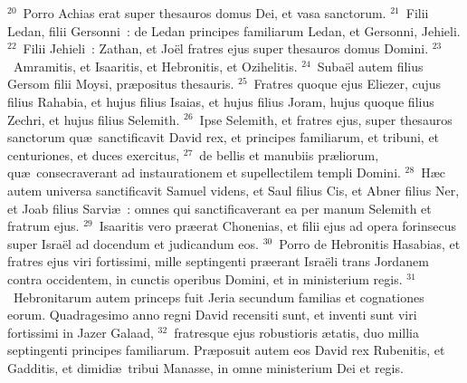 ${}^{20}$~Porro Achias erat super thesauros domus Dei, et vasa sanctorum.
${}^{21}$~Filii Ledan, filii Gersonni~: de Ledan principes familiarum Ledan, et Gersonni, Jehieli.
${}^{22}$~Filii Jehieli~: Zathan, et Jo\"el fratres ejus super thesauros domus Domini.
${}^{23}$~Amramitis, et Isaaritis, et Hebronitis, et Ozihelitis.
${}^{24}$~Suba\"el autem filius Gersom filii Moysi, pr\ae positus thesauris.
${}^{25}$~Fratres quoque ejus Eliezer, cujus filius Rahabia, et hujus filius Isaias, et hujus filius Joram, hujus quoque filius Zechri, et hujus filius Selemith.
${}^{26}$~Ipse Selemith, et fratres ejus, super thesauros sanctorum qu\ae\ sanctificavit David rex, et principes familiarum, et tribuni, et centuriones, et duces exercitus,
${}^{27}$~de bellis et manubiis pr\ae liorum, qu\ae\ consecraverant ad instaurationem et supellectilem templi Domini.
${}^{28}$~H\ae c autem universa sanctificavit Samuel videns, et Saul filius Cis, et Abner filius Ner, et Joab filius Sarvi\ae~: omnes qui sanctificaverant ea per manum Selemith et fratrum ejus.
${}^{29}$~Isaaritis vero pr\ae erat Chonenias, et filii ejus ad opera forinsecus super Isra\"el ad docendum et judicandum eos.
${}^{30}$~Porro de Hebronitis Hasabias, et fratres ejus viri fortissimi, mille septingenti pr\ae erant Isra\"eli trans Jordanem contra occidentem, in cunctis operibus Domini, et in ministerium regis.
${}^{31}$~Hebronitarum autem princeps fuit Jeria secundum familias et cognationes eorum. Quadragesimo anno regni David recensiti sunt, et inventi sunt viri fortissimi in Jazer Galaad,
${}^{32}$~fratresque ejus robustioris \ae tatis, duo millia septingenti principes familiarum. Pr\ae posuit autem eos David rex Rubenitis, et Gadditis, et dimidi\ae\ tribui Manasse, in omne ministerium Dei et regis.

